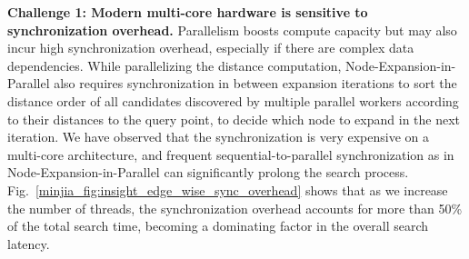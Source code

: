 \textbf{Challenge 1: Modern multi-core hardware is sensitive to synchronization overhead.}
Parallelism boosts compute capacity but may also incur high synchronization overhead, especially if there are complex data dependencies. While parallelizing the distance computation,  Node-Expansion-in-Parallel also requires synchronization in between expansion iterations to sort the distance order of all candidates discovered by multiple parallel workers according to their distances to the query point, to decide which node to expand in the next iteration. We have observed that the synchronization is very expensive on a multi-core architecture, and frequent sequential-to-parallel synchronization as in Node-Expansion-in-Parallel can significantly prolong the search process. 
Fig.~\ref{minjia_fig:insight_edge_wise_sync_overhead} shows that as we increase the number of threads, the synchronization overhead accounts for more than 50\%
of the total search time, becoming a dominating factor in the overall search latency. 

